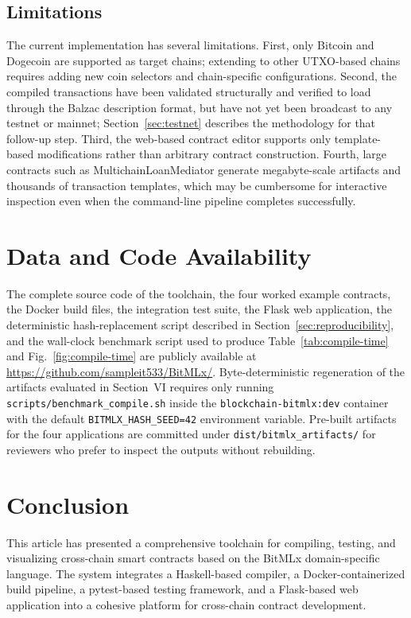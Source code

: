 \documentclass[journal]{IEEEtran}
\begin{document}
\subsection{Limitations}

The current implementation has several limitations. First, only Bitcoin and Dogecoin are supported as target chains; extending to other UTXO-based chains requires adding new coin selectors and chain-specific configurations. Second, the compiled transactions have been validated structurally and verified to load through the Balzac description format, but have not yet been broadcast to any testnet or mainnet; Section~\ref{sec:testnet} describes the methodology for that follow-up step. Third, the web-based contract editor supports only template-based modifications rather than arbitrary contract construction. Fourth, large contracts such as MultichainLoanMediator generate megabyte-scale artifacts and thousands of transaction templates, which may be cumbersome for interactive inspection even when the command-line pipeline completes successfully.

\section{Data and Code Availability}
\label{sec:availability}

The complete source code of the toolchain, the four worked example contracts, the Docker build files, the integration test suite, the Flask web application, the deterministic hash-replacement script described in Section~\ref{sec:reproducibility}, and the wall-clock benchmark script used to produce Table~\ref{tab:compile-time} and Fig.~\ref{fig:compile-time} are publicly available at \url{https://github.com/sampleit533/BitMLx/}. Byte-deterministic regeneration of the artifacts evaluated in Section~VI requires only running \texttt{scripts/benchmark\_compile.sh} inside the \texttt{blockchain-bitmlx:dev} container with the default \texttt{BITMLX\_HASH\_SEED=42} environment variable. Pre-built artifacts for the four applications are committed under \texttt{dist/bitmlx\_artifacts/} for reviewers who prefer to inspect the outputs without rebuilding.

\section{Conclusion}

This article has presented a comprehensive toolchain for compiling, testing, and visualizing cross-chain smart contracts based on the BitMLx domain-specific language. The system integrates a Haskell-based compiler, a Docker-containerized build pipeline, a pytest-based testing framework, and a Flask-based web application into a cohesive platform for cross-chain contract development.
\end{document}
